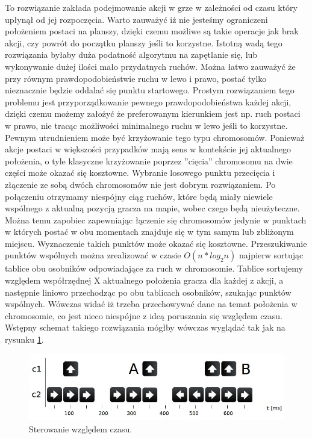 \begin{par}
\begin{enumerate}
\begin{par}
		To rozwiązanie zakłada podejmowanie akcji w grze w zależności od czasu który upłynął od jej rozpoczęcia.
		Warto zauważyć iż nie jesteśmy ograniczeni położeniem postaci na planszy, dzięki czemu możliwe są takie operacje jak brak akcji, czy powrót do początku planszy jeśli to korzystne.
		Istotną wadą tego rozwiązania byłaby duża podatność algorytmu na zapętlanie się, lub wykonywanie dużej ilości mało przydatnych ruchów. 
		Można łatwo zauważyć że przy równym prawdopodobieństwie ruchu w lewo i prawo, postać tylko nieznacznie będzie oddalać się punktu startowego. 
		Prostym rozwiązaniem tego problemu jest przyporządkowanie pewnego prawdopodobieństwa każdej akcji, dzięki czemu możemy założyć że preferowanym kierunkiem jest np. ruch postaci w prawo, nie tracąc możliwości minimalnego ruchu w lewo jeśli to korzystne.
		Pewnym utrudnieniem może być krzyżowanie tego typu chromosomów. Ponieważ akcje postaci w większości przypadków mają sens w kontekście jej aktualnego położenia, o tyle klasyczne krzyżowanie poprzez ''cięcia'' chromosomu na dwie części może okazać się kosztowne.
		Wybranie losowego punktu przecięcia i złączenie ze sobą dwóch chromosomów nie jest dobrym rozwiązaniem.
		Po połączeniu otrzymamy niespójny ciąg ruchów, które będą miały niewiele wspólnego z aktualną pozycją gracza na mapie, wobec czego będą nieużyteczne.
		Można temu zapobiec zapewniając łączenie się chromosomów jedynie w punktach w których postać w obu momentach znajduje się w tym samym lub zbliżonym miejscu. Wyznaczenie takich punktów może okazać się kosztowne.
		Przeszukiwanie punktów wspólnych można zrealizować w czasie $O(n*log_2n)$ najpierw sortując tablice obu osobników odpowiadające za ruch w chromosomie. 
		Tablice sortujemy względem współrzędnej X aktualnego położenia gracza dla każdej z akcji, a następnie liniowo przechodząc po obu tablicach osobników, szukając punktów wspólnych.
		Wówczas widać iż trzeba przechowywać dane na temat położenia w chromosomie, co jest nieco niespójne z ideą poruszania się względem czasu.
		Wstępny schemat takiego rozwiązania mógłby wówczas wyglądać tak jak na rysunku \ref{fig:sterowanie}.
		
		\begin{figure}[!h]
		\centering
		\includegraphics[width=\textwidth]{obrazki/sterowanie.jpg}
		\caption{Sterowanie względem czasu.}
		\label{fig:sterowanie}
		\end{figure}
		

\end{par}
\end{enumerate}
\end{par}
